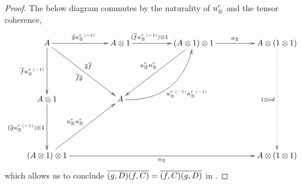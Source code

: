 \begin{proof}

      The below diagram commutes by the naturality of $u_{\otimes}^r$ and the tensor coherence,
      \[
        \xymatrix @C=48pt @R=55pt{
          A \ar[r]^{\restr{g} \inv{\usr}}
            \ar[dr]_{\restr{f}\restr{g}}^{\restr{g}\restr{f}}
            \ar[d]_{\restr{f}\inv{\usr}}
            &A\*1 \ar[r]^(.4){(\rst{f}\inv{\usr})\*1}
            & (A \*1) \* 1
            \ar[r]^{a_{\*}}  \ar[dl]_{\usr \usr}
            & A \* (1\*1) \ar@{.>}[dd]_{1\*id}\\ %
          A\*1 \ar[d]_{(\rst{g}\inv{\usr})\*1}
            &A \ar@/_25pt/[ur]_{\inv{\usr}\inv{\usr}} \\
          (A\*1)\*1 \ar[rrr]_{a_\*} \ar[ur]^{\usr \usr}
            &&& A \* (1\*1)
        }
      \]
      which allows us to conclude $\overline{(g,D)} \overline{(f,C)} = \overline{(f,C)} \overline{(g,D)}$ in \Xt.


\end{proof}
